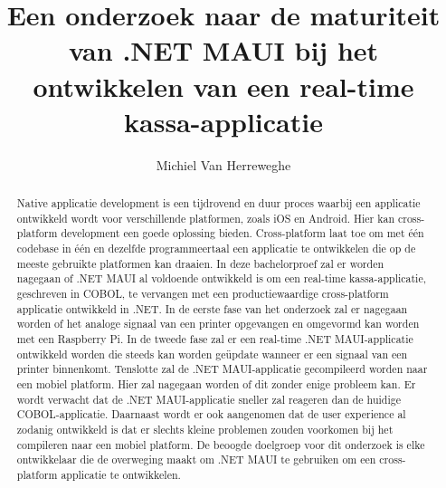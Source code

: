 \documentclass{hogent-article}
\title{Een onderzoek naar de maturiteit van .NET MAUI bij het ontwikkelen van een real-time kassa-applicatie}
\author{Michiel Van Herreweghe}
\begin{document}
\begin{abstract}
Native applicatie development is een tijdrovend en duur proces waarbij een applicatie ontwikkeld wordt voor verschillende platformen, zoals iOS en Android. Hier kan cross-platform development een goede oplossing bieden. Cross-platform laat toe om met één codebase in één en dezelfde programmeertaal een applicatie te ontwikkelen die op de meeste gebruikte platformen kan draaien. In deze bachelorproef zal er worden nagegaan of .NET MAUI al voldoende ontwikkeld is om een real-time kassa-applicatie, geschreven in COBOL, te vervangen met een productiewaardige cross-platform applicatie ontwikkeld in .NET.
In de eerste fase van het onderzoek zal er nagegaan worden of het analoge signaal van een printer opgevangen en omgevormd kan worden met een Raspberry Pi.
In de tweede fase zal er een real-time .NET MAUI-applicatie ontwikkeld worden die steeds kan worden geüpdate wanneer er een signaal van een printer binnenkomt.
Tenslotte zal de .NET MAUI-applicatie gecompileerd worden naar een mobiel platform. Hier zal nagegaan worden of dit zonder enige probleem kan.
Er wordt verwacht dat de .NET MAUI-applicatie sneller zal reageren dan de huidige COBOL-applicatie. Daarnaast wordt er ook aangenomen dat de user experience al zodanig ontwikkeld is dat er slechts kleine problemen zouden voorkomen bij het compileren naar een mobiel platform.
De beoogde doelgroep voor dit onderzoek is elke ontwikkelaar die de overweging maakt om .NET MAUI te gebruiken om een cross-platform applicatie te ontwikkelen.
\end{abstract}

\tableofcontents


\pagebreak
\printbibliography[heading=bibintoc]
\end{document}
